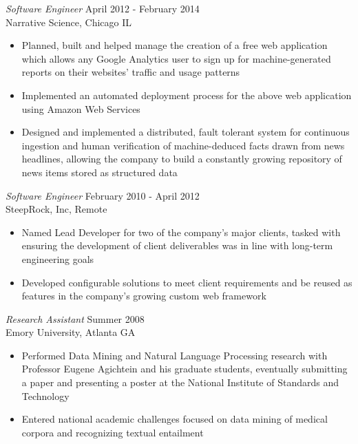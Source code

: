 \documentclass[line,margin]{res}
\begin{document}
\begin{resume}
        {\sl Software Engineer} \hfill April 2012 - February 2014 \\
        Narrative Science, Chicago IL
        \begin{itemize}
        \item Planned, built and helped manage the creation of a
          free web application which allows any Google Analytics
          user to sign up for machine-generated reports on their
          websites' traffic and usage patterns
        \item Implemented an automated deployment process for the
          above web application using Amazon Web Services
        \item Designed and implemented a distributed, fault tolerant
          system for continuous ingestion and human verification of
          machine-deduced facts drawn from news headlines, allowing
          the company to build a constantly growing repository of news
          items stored as structured data
        \end{itemize}

        {\sl Software Engineer} \hfill February 2010 - April 2012 \\
        SteepRock, Inc, Remote
        \begin{itemize}
        \item Named Lead Developer for two of the company's major
          clients, tasked with ensuring the development of client
          deliverables was in line with long-term engineering goals
        \item Developed configurable solutions to meet client
          requirements and be reused as features in the company's
          growing custom web framework
        \end{itemize}

        {\sl Research Assistant} \hfill Summer 2008 \\
        Emory University, Atlanta GA
        \begin{itemize}
        \item Performed Data Mining and Natural Language Processing research
          with Professor Eugene Agichtein and his graduate students,
          eventually submitting a paper and presenting a poster at the National
          Institute of Standards and Technology
        \item Entered national academic challenges focused on data
          mining of medical corpora and recognizing textual entailment
        \end{itemize}


\end{resume}
\end{document}
